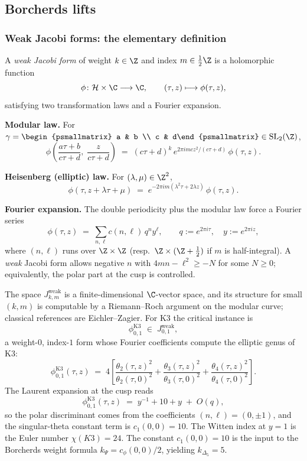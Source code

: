 \subsection{Borcherds lifts}
\label{gluech:7.2}

\subsubsection{Weak Jacobi forms: the elementary definition}

A \emph{weak Jacobi form} of weight $k \in \Z$ and index $m \in \tfrac12 \Z$ is a holomorphic function
\[
 \phi\colon \mathcal H \times \C \longrightarrow \C,
 \qquad (\tau, z) \longmapsto \phi(\tau, z),
\]
satisfying two transformation laws and a Fourier expansion.

\textbf{Modular law.} For $\gamma = \begin{psmallmatrix} a & b \\ c & d\end{psmallmatrix} \in \mathrm{SL}_2(\Z)$,
\[
 \phi\!\left(\frac{a\tau + b}{c\tau + d}, \; \frac{z}{c\tau + d}\right) \;=\; (c\tau + d)^k \, e^{2\pi i m c z^2 / (c\tau+d)} \, \phi(\tau, z).
\]

\textbf{Heisenberg (elliptic) law.} For $(\lambda, \mu) \in \Z^2$,
\[
 \phi(\tau, z + \lambda \tau + \mu) \;=\; e^{-2\pi i m (\lambda^2 \tau + 2\lambda z)} \, \phi(\tau, z).
\]

\textbf{Fourier expansion.} The double periodicity plus the modular law force a Fourier series
\[
 \phi(\tau, z) \;=\; \sum_{n, \ell} c(n, \ell) \, q^n y^\ell,
 \qquad q := e^{2\pi i \tau}, \quad y := e^{2\pi i z},
\]
where $(n, \ell)$ runs over $\Z \times \Z$ (resp.\ $\Z \times (\Z + \tfrac12)$ if $m$ is half-integral). A \emph{weak} Jacobi form allows negative $n$ with $4mn - \ell^2 \geq -N$ for some $N \geq 0$; equivalently, the polar part at the cusp is controlled.

The space $J_{k, m}^{\mathrm{weak}}$ is a finite-dimensional $\C$-vector space, and its structure for small $(k, m)$ is computable by a Riemann--Roch argument on the modular curve; classical references are Eichler--Zagier. For K3 the critical instance is
\[
 \phi_{0, 1}^{\mathrm{K3}} \;\in\; J_{0, 1}^{\mathrm{weak}},
\]
a weight-$0$, index-$1$ form whose Fourier coefficients compute the elliptic genus of K3:
\[
 \phi_{0, 1}^{\mathrm{K3}}(\tau, z) \;=\; 4 \left[ \frac{\theta_2(\tau, z)^2}{\theta_2(\tau, 0)^2} + \frac{\theta_3(\tau, z)^2}{\theta_3(\tau, 0)^2} + \frac{\theta_4(\tau, z)^2}{\theta_4(\tau, 0)^2} \right].
\]
The Laurent expansion at the cusp reads
\[
 \phi_{0, 1}^{\mathrm{K3}}(\tau, z) \;=\; y^{-1} + 10 + y \;+\; O(q),
\]
so the polar discriminant comes from the coefficients
\((n,\ell)=(0,\pm1)\), and the singular-theta constant term is
\(c_1(0,0)=10\).  The Witten index at \(y=1\) is the Euler number
\(\chi(K3)=24\).  The constant \(c_1(0,0)=10\) is the input to the
Borcherds weight formula \(k_{\Psi}=c_\phi(0,0)/2\), yielding
\(k_{\Delta_5}=5\).

